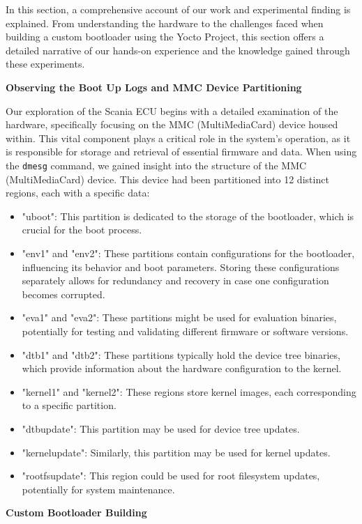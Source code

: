 In this section, a comprehensive account of our work and experimental finding is explained. From understanding the hardware to the challenges faced when building a custom bootloader using the Yocto Project, this section offers a detailed narrative of our hands-on experience and the knowledge gained through these experiments.

\textbf{Observing the Boot Up Logs and MMC Device Partitioning}

Our exploration of the Scania ECU begins with a detailed examination of the hardware, specifically focusing on the MMC (MultiMediaCard) device housed within. This vital component plays a critical role in the system's operation, as it is responsible for storage and retrieval of essential firmware and data. When using the \texttt{dmesg} command, we gained insight into the structure of the MMC (MultiMediaCard) device. This device had been partitioned into 12 distinct regions, each with a specific data:

\begin{itemize}
	\item "uboot": This partition is dedicated to the storage of the bootloader, which is crucial for the boot process.
	\item "env1" and "env2": These partitions contain configurations for the bootloader, influencing its behavior and boot parameters. Storing these configurations separately allows for redundancy and recovery in case one configuration becomes corrupted.
	\item "eva1" and "eva2": These partitions might be used for evaluation binaries, potentially for testing and validating different firmware or software versions.
	\item "dtb1" and "dtb2": These partitions typically hold the device tree binaries, which provide information about the hardware configuration to the kernel.
	\item "kernel1" and "kernel2": These regions store kernel images, each corresponding to a specific partition.
	\item "dtbupdate": This partition may be used for device tree updates.
	\item "kernelupdate": Similarly, this partition may be used for kernel updates.
	\item "rootfsupdate": This region could be used for root filesystem updates, potentially for system maintenance.
\end{itemize}

\textbf{Custom Bootloader Building}

